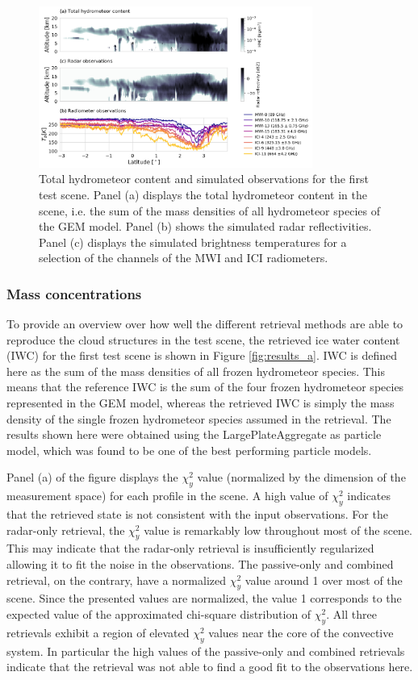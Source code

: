 \documentclass[journal abbreviation, manuscript]{copernicus}
\begin{document}
\begin{figure}
\centering
\includegraphics[width = 0.8\textwidth]{../plots/observations_a}
\caption{Total hydrometeor content and simulated observations for the first test
  scene. Panel (a) displays the total hydrometeor content in the scene, i.e. the
  sum of the mass densities of all hydrometeor species of the GEM model. Panel
  (b) shows the simulated radar reflectivities. Panel (c) displays the simulated
  brightness temperatures for a selection of the channels of the MWI and ICI
  radiometers.}
\label{fig:observations_a}
\end{figure}

\subsubsection{Mass concentrations}

To provide an overview over how well the different retrieval methods are able to
reproduce the cloud structures in the test scene, the retrieved ice water
content (IWC) for the first test scene is shown in Figure \ref{fig:results_a}.
IWC is defined here as the sum of the mass densities of all frozen hydrometeor
species. This means that the reference IWC is the sum of the four frozen
hydrometeor species represented in the GEM model, whereas the retrieved IWC is
simply the mass density of the single frozen hydrometeor species assumed in the
retrieval. The results shown here were obtained using the LargePlateAggregate as
particle model, which was found to be one of the best performing particle
models.

Panel (a) of the figure displays the $\chi^2_y$ value (normalized by the
dimension of the measurement space) for each profile in the scene. A high value
of $\chi^2_y$ indicates that the retrieved state is not consistent with the
input observations. For the radar-only retrieval, the $\chi^2_y$ value is
remarkably low throughout most of the scene. This may indicate that the
radar-only retrieval is insufficiently regularized allowing it to fit the noise
in the observations. The passive-only and combined retrieval, on the contrary,
have a normalized $\chi^2_y$ value around 1 over most of the scene. Since the
presented values are normalized, the value 1 corresponds to the expected value
of the approximated chi-square distribution of $\chi^2_y$. All three retrievals
exhibit a region of elevated $\chi^2_y$ values near the core of the convective
system. In particular the high values of the passive-only and combined
retrievals indicate that the retrieval was not able to find a good fit to
the observations here.
\end{document}
